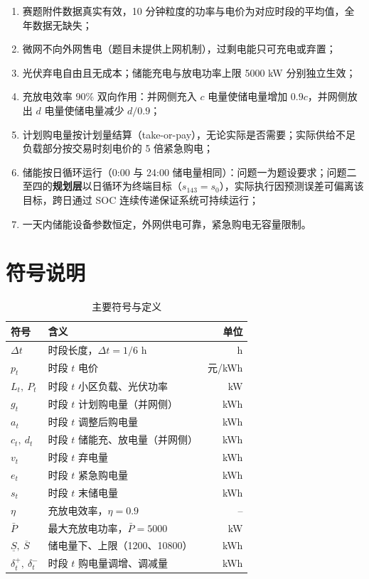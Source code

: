 \documentclass[zihao=-4,a4paper,UTF8,fontset=none]{ctexart}
\begin{document}
\begin{enumerate}
  \item 赛题附件数据真实有效，10 分钟粒度的功率与电价为对应时段的平均值，全年数据无缺失；
  \item 微网不向外网售电（题目未提供上网机制），过剩电能只可充电或弃置；
  \item 光伏弃电自由且无成本；储能充电与放电功率上限 5000 kW 分别独立生效；
  \item 充放电效率 90\% 双向作用：并网侧充入 $c$ 电量使储电量增加 $0.9c$，并网侧放出 $d$ 电量使储电量减少 $d/0.9$；
  \item 计划购电量按计划量结算（take-or-pay），无论实际是否需要；实际供给不足负载部分按交易时刻电价的 5 倍紧急购电；
  \item 储能按日循环运行（0:00 与 24:00 储电量相同）：问题一为题设要求；问题二至四的\textbf{规划层}以日循环为终端目标（$s_{143} = s_0$），实际执行因预测误差可偏离该目标，跨日通过 SOC 连续传递保证系统可持续运行；
  \item 一天内储能设备参数恒定，外网供电可靠，紧急购电无容量限制。
\end{enumerate}

\section{符号说明}

\begin{table}[H]
  \centering
  \caption{主要符号与定义}
  \label{tab:symbols}
  \begin{tabularx}{0.88\textwidth}{C{0.14\textwidth}Y R}
    \toprule
    符号 & 含义 & 单位 \\
    \midrule
    $\Delta t$ & 时段长度，$\Delta t=1/6$ h & h \\
    $p_t$ & 时段 $t$ 电价 & 元/kWh \\
    $L_t,\ P_t$ & 时段 $t$ 小区负载、光伏功率 & kW \\
    $g_t$ & 时段 $t$ 计划购电量（并网侧） & kWh \\
    $a_t$ & 时段 $t$ 调整后购电量 & kWh \\
    $c_t,\ d_t$ & 时段 $t$ 储能充、放电量（并网侧） & kWh \\
    $v_t$ & 时段 $t$ 弃电量 & kWh \\
    $e_t$ & 时段 $t$ 紧急购电量 & kWh \\
    $s_t$ & 时段 $t$ 末储电量 & kWh \\
    $\eta$ & 充放电效率，$\eta=0.9$ & -- \\
    $\bar P$ & 最大充放电功率，$\bar P=5000$ & kW \\
    $\underline S,\ \overline S$ & 储电量下、上限（1200、10800） & kWh \\
    $\delta_t^{+},\ \delta_t^{-}$ & 时段 $t$ 购电量调增、调减量 & kWh \\
    \bottomrule
  \end{tabularx}
\end{table}
\end{document}
